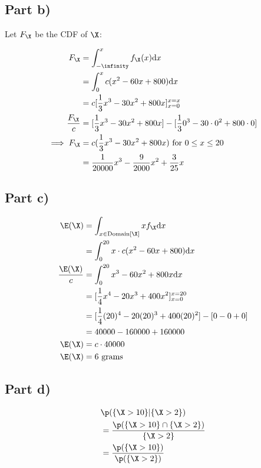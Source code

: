 \subsection{Part b)}

Let $F_{\X}$ be the CDF of $\X$:

\begin{align*}
F_{\X} &= \int _{-\infinity} ^{x} f_{\X}(x) \mathrm{d}x \\
&= \int _0 ^{x} c(x^2 - 60x + 800) \mathrm{d}x \\
&= c [\frac{1}{3}x^3 - 30x^2 + 800x]_{x =0}^{x = x} \\
\frac{F_{\X}}{c} &= [\frac{1}{3} x^3 - 30x^2 + 800x] - [\frac{1}{3} 0^3 - 30\cdot0^2 + 800\cdot0] \\
\implies F_{\X} &= c(\frac{1}{3} x^3 - 30x^2 + 800x) \text{ for } 0 \leq x \leq 20 \\
&= \frac{1}{20000}x^3 - \frac{9}{2000}x^2 + \frac{3}{25}x
\end{align*}

\subsection{Part c)}

\begin{align*}
\E(\X) &= \int _{x \in \mathrm{Domain}[\X]} xf_{\X}\mathrm{d}x \\
&= \int _0 ^{20} x \cdot c(x^2 - 60x + 800)\mathrm{d}x \\
\frac{\E(\X)}{c} &= \int _0 ^{20} x^3 - 60x^2 + 800x \mathrm{d}x \\
 &= [\frac{1}{4} x^4 - 20x^3 + 400x^2]^{x=20}_{x=0} \\
 &= [\frac{1}{4}(20)^4 - 20(20)^3 + 400 (20)^2] - [0 - 0 + 0] \\
 &= 40000 - 160000 + 160000 \\
\E(\X) &= c \cdot 40000 \\
\E(\X) &= 6 \text{ grams}
\end{align*}

\subsection{Part d)}

\begin{align*}
& \p (\{ \X > 10 \} | \{ \X > 2 \}) \\
&= \frac{\p(\{ \X > 10 \} \cap  \{ \X > 2 \})}{\{ \X > 2 \}} \\
&= \frac{\p(\{ \X > 10 \})}{\p (\{ \X > 2 \})}
\end{align*}

